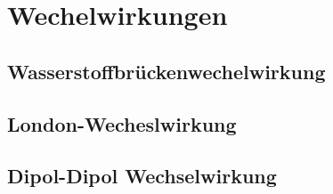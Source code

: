 \section{Wechelwirkungen}
\subsection{Wasserstoffbrückenwechelwirkung}
\subsection{London-Wecheslwirkung}
\subsection{Dipol-Dipol Wechselwirkung}
